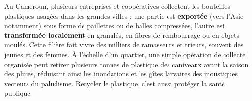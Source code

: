 \documentclass[11pt]{article}
\begin{document}
\begin{savaistu}
Au Cameroun, plusieurs entreprises et coopératives collectent les bouteilles plastiques usagées dans les grandes villes : une partie est \textbf{exportée} (vers l'Asie notamment) sous forme de paillettes ou de balles compressées, l'autre est \textbf{transformée localement} en granulés, en fibres de rembourrage ou en objets moulés. Cette filière fait vivre des milliers de ramasseurs et trieurs, souvent des jeunes et des femmes. À l'échelle d'un quartier, une simple opération de collecte organisée peut retirer plusieurs tonnes de plastique des caniveaux avant la saison des pluies, réduisant ainsi les inondations et les gîtes larvaires des moustiques vecteurs du paludisme. Recycler le plastique, c'est aussi protéger la santé publique.
\end{savaistu}
\end{document}
